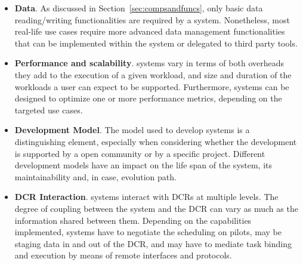 \documentclass{sig-alternate}
\begin{document}
\begin{itemize}


\item \textbf{Data}. As discussed in Section~\ref{sec:compsandfuncs}, only
  basic data reading/writing functionalities are required by a
  \pilot system. Nonetheless, most real-life use cases require more
  advanced data management functionalities that can be implemented within the
  \pilot system or delegated to third party tools.

\item \textbf{Performance and scalability}. \pilot systems vary in
  terms of  both overheads they add to the execution of a given workload, and
  size and duration of the workloads a user can expect to be supported.
  Furthermore, \pilot systems can be designed to optimize one or more
  performance metrics, depending on the targeted use cases.

\item \textbf{Development Model}. The model used to develop \pilot systems is a
  distinguishing element, especially when considering whether the development
  is supported by a open community or by a specific project. Different
  development models have an impact on the life span of the \pilot system, its
  maintainability and, in case, evolution path.

\item \textbf{DCR Interaction}. \pilot systems interact with DCRs at multiple
  levels. The degree of coupling between the \pilot system and the DCR can vary
  as much as the information shared between them. Depending on the capabilities
  implemented, \pilot systems have to negotiate the scheduling on pilots, may be
  staging data in and out of the DCR, and may have to mediate task binding and
  execution by means of remote interfaces and protocols.

\end{itemize}
\end{document}
